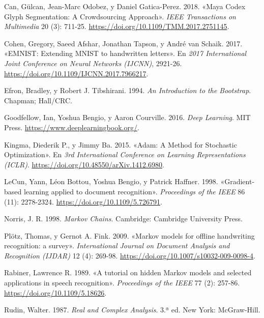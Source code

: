 \documentclass[
  spanish,
  us-letterpaper,
]{scrreprt}
\newlength{\cslhangindent}
\newenvironment{CSLReferences}[2] %
 {\begin{list}{}{%
  \setlength{\itemindent}{0pt}
  \setlength{\leftmargin}{0pt}
  \setlength{\parsep}{0pt}
  \ifodd #1
   \setlength{\leftmargin}{\cslhangindent}
   \setlength{\itemindent}{-1\cslhangindent}
  \fi
  \setlength{\itemsep}{#2\baselineskip}}}
 {\end{list}}
\theoremstyle{definition}
\theoremstyle{remark}
\begin{document}
\label{refs}
\begin{CSLReferences}{1}{0}
Can, Gülcan, Jean-Marc Odobez, y Daniel Gatica-Perez. 2018. {«Maya Codex
Glyph Segmentation: A Crowdsourcing Approach»}. \emph{IEEE Transactions
on Multimedia} 20 (3): 711-25.
\url{https://doi.org/10.1109/TMM.2017.2751145}.

Cohen, Gregory, Saeed Afshar, Jonathan Tapson, y André van Schaik. 2017.
{«{EMNIST}: Extending {MNIST} to handwritten letters»}. En \emph{2017
International Joint Conference on Neural Networks (IJCNN)}, 2921-26.
\url{https://doi.org/10.1109/IJCNN.2017.7966217}.

Efron, Bradley, y Robert J. Tibshirani. 1994. \emph{An Introduction to
the Bootstrap}. Chapman; Hall/CRC.

Goodfellow, Ian, Yoshua Bengio, y Aaron Courville. 2016. \emph{Deep
Learning}. MIT Press. \url{https://www.deeplearningbook.org/}.

Kingma, Diederik P., y Jimmy Ba. 2015. {«Adam: A Method for Stochastic
Optimization»}. En \emph{3rd International Conference on Learning
Representations (ICLR)}. \url{https://doi.org/10.48550/arXiv.1412.6980}.

LeCun, Yann, Léon Bottou, Yoshua Bengio, y Patrick Haffner. 1998.
{«Gradient-based learning applied to document recognition»}.
\emph{Proceedings of the IEEE} 86 (11): 2278-2324.
\url{https://doi.org/10.1109/5.726791}.

Norris, J. R. 1998. \emph{Markov Chains}. Cambridge: Cambridge
University Press.

Plötz, Thomas, y Gernot A. Fink. 2009. {«Markov models for offline
handwriting recognition: a survey»}. \emph{International Journal on
Document Analysis and Recognition (IJDAR)} 12 (4): 269-98.
\url{https://doi.org/10.1007/s10032-009-0098-4}.

Rabiner, Lawrence R. 1989. {«A tutorial on hidden Markov models and
selected applications in speech recognition»}. \emph{Proceedings of the
IEEE} 77 (2): 257-86. \url{https://doi.org/10.1109/5.18626}.

Rudin, Walter. 1987. \emph{Real and Complex Analysis}. 3.ª ed. New York:
McGraw-Hill.


\end{CSLReferences}
\end{document}
